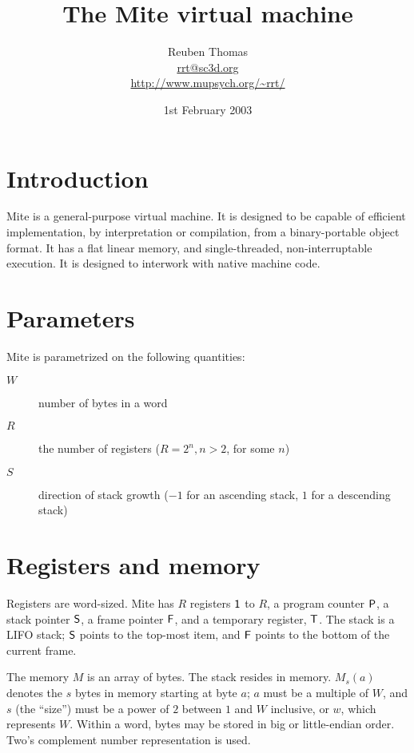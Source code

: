\documentclass[english]{scrartcl}
\newcommand{\synfont}{\sffamily}
\newcommand{\syn}[1]{\ensuremath{\text{\synfont #1}}}
\begin{document}
\title{The Mite virtual machine}
\author{Reuben Thomas\\\url{rrt@sc3d.org}\\\url{http://www.mupsych.org/~rrt/}}
\date{1st February 2003}
\maketitle



\section{Introduction}

Mite is a general-purpose virtual machine. It is designed to be
capable of efficient implementation, by interpretation or compilation,
from a binary-portable object format. It has a flat linear memory, and
single-threaded, non-interruptable execution. It is designed to
interwork with native machine code.



\section{Parameters}

Mite is parametrized on the following quantities:

\begin{description}
\item[$W$]number of bytes in a word

\item[$R$]the number of registers ($R=2^n, n>2$, for some $n$)

\item[$S$]direction of stack growth ($-1$ for an ascending stack, $1$
  for a descending stack)
\end{description}



\section{Registers and memory}

Registers are word-sized. Mite has $R$ registers \syn{1} to $R$, a
program counter \syn{P}, a stack pointer \syn{S}, a frame pointer
\syn{F}, and a temporary register, \syn{T}. The stack is a LIFO
stack; \syn{S} points to the top-most item, and \syn{F} points to the
bottom of the current frame.

The memory $M$ is an array of bytes. The stack resides in memory.
$M_s(a)$ denotes the $s$ bytes in memory starting at byte $a$; $a$
must be a multiple of $W$, and $s$ (the ``size'') must be a power of
$2$ between $1$ and $W$ inclusive, or $w$, which represents $W$.
Within a word, bytes may be stored in big or little-endian order.
Two's complement number representation is used.
\end{document}
